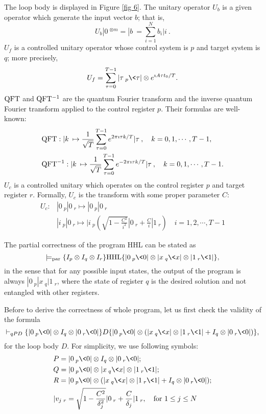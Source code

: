 The loop body is displayed in Figure \ref{fig 6}. The unitary operator $U_b$ is a given operator which generate the input vector $b$; that is, $$U_b|0\>^{\otimes m} = |b\> = \sum_{i=1}^Nb_i|i\>.$$
$U_f$ is a controlled unitary operator whose control system is $p$ and target system is $q$; more precisely,
$$U_f = \sum_{\tau = 0}^{T-1} |\tau\>_p\<\tau|\otimes e^{\imath A\tau t_0/T}.$$
$\rm QFT$ and $\rm QFT^{-1}$ are the quantum Fourier transform and the inverse quantum Fourier transform applied to the control register $p$. Their formulas are well-known:
\begin{align*}
&{\rm QFT}: |k\>\mapsto \frac{1}{\sqrt{T}}\sum_{\tau = 0}^{T-1}e^{2\pi\imath \tau k/T}|\tau\>,\quad k = 0,1,\cdots,T-1,\\
&{\rm QFT}^{-1}: |k\>\mapsto \frac{1}{\sqrt{T}}\sum_{\tau = 0}^{T-1}e^{-2\pi\imath \tau k/T}|\tau\>,\quad k = 0,1,\cdots,T-1.
\end{align*}
$U_c$ is a controlled unitary which operates on the control register $p$ and target register $r$. Formally, $U_c$ is the transform with some proper parameter $C$:
\begin{align*}
U_c: &|0\>_p|0\>_r \mapsto |0\>_p|0\>_r \\
&|i\>_p|0\>_r \mapsto |i\>_p(\sqrt{1-\frac{C^2}{i^2}}|0\>_r + \frac{C}{i}|1\>_r) \quad i = 1,2,\cdots,T-1
\end{align*}

The partial correctness of the program HHL can be stated as
\begin{equation}
\label{HHLcorrectformular}
\models_{\rm par}\{I_p\otimes I_q\otimes I_r\}{\rm HHL}\{|0\>_p\<0|\otimes |x\>_q\<x|\otimes|1\>_r\<1|\},
\end{equation}
in the sense that for any possible input states, the output of the program is always $|0\>_p|x\>_q|1\>_r$, where the state of register $q$ is the desired solution and not entangled with other registers.

Before to derive the correctness of whole program, let us first check the validity of the formula $$\vdash_{qPD}\{|0\>_p\<0|\otimes I_q\otimes |0\>_r\<0|\}D\{|0\>_p\<0|\otimes (|x\>_q\<x|\otimes|1\>_r\<1| + I_q\otimes |0\>_r\<0|)\},$$
for the loop body $D$. For simplicity, we use following symbols:
\begin{align*}
&P = |0\>_p\<0|\otimes I_q\otimes |0\>_r\<0|; \\
&Q = |0\>_p\<0|\otimes |x\>_q\<x|\otimes|1\>_r\<1|; \\
&R = |0\>_p\<0|\otimes (|x\>_q\<x|\otimes|1\>_r\<1| + I_q\otimes |0\>_r\<0|); \\
&|v_j\>_r = \sqrt{1-\frac{C^2}{\delta_j^2}}|0\>_r + \frac{C}{\delta_j}|1\>_r,\quad{\rm for}~1\le j\le N
\end{align*}

